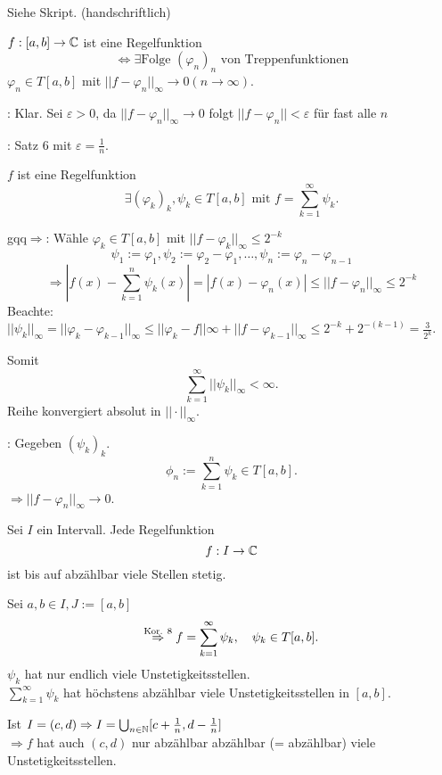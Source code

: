 \documentclass[../ana2.tex]{subfiles}
\begin{document}
\begin{bew}
    Siehe Skript. (handschriftlich)
\end{bew}
\begin{kor}
    \( f:[a,b]\rightarrow \mathbb{C} \) ist eine Regelfunktion 
    \[ \Leftrightarrow \exists \text{Folge } 
    (\varphi_n)_n \text{ von Treppenfunktionen} \]
    \( \varphi_n \in T[a,b] \) mit \( ||f-\varphi_n||_\infty 
    \rightarrow 0 (n\rightarrow \infty) \).
\end{kor}
\begin{bew}
    \gqq{\( \Leftarrow \)}: Klar. Sei \( \varepsilon > 0\), 
    da \( ||f-\varphi_n||_\infty \rightarrow 0 \) folgt 
    \( ||f-\varphi_n|| < \varepsilon \) für fast alle \(n\)
    
    \gqq{\( \Rightarrow \)}: Satz \(6\) 
    mit \( \varepsilon = \frac{1}{n} \).
\end{bew}
\begin{kor}
    \( f \) ist eine Regelfunktion
    \[ \exists (\varphi_k)_k, \psi_k \in T[a,b] 
    \text{ mit } f = \sum_{k=1}^\infty \psi_k. \]
\end{kor}
\begin{bew}
    gqq{\( \Rightarrow \)}: Wähle \( \varphi_k \in T[a,b] \)
    mit \( ||f-\varphi_k||_\infty \leq 2^{-k} \)
    \[ \psi_1 := \varphi_1, \psi_2 := \varphi_2 - \varphi_1, 
    \ldots, \psi_n := \varphi_n - \varphi_{n-1} \]
    \[ \Rightarrow |f(x) - \sum_{k=1}^n \psi_k(x)| 
    = |f(x)-\varphi_n(x)| \leq ||f-\varphi_n||_\infty \leq 2^{-k} \]
    Beachte: \( ||\psi_k||_\infty = ||\varphi_k - \varphi_{k-1}||_\infty
    \leq ||\varphi_k-f||\infty + ||f-\varphi_{k-1}||_\infty
    \leq 2^{-k} +  2^{-(k-1)} = \frac{3}{2^k} \).

    Somit 
    \[ \sum_{k=1}^\infty ||\psi_k||_\infty < \infty. \]
    Reihe konvergiert absolut in \( ||\cdot||_\infty \).

    \gqq{\( \Leftarrow \)}: Gegeben \( (\psi_k)_k \).
    \[ \phi_n := \sum_{k=1}^n \psi_k \in T[a,b]. \]
    \( \Rightarrow ||f - \varphi_n||_\infty \rightarrow 0 \).
\end{bew}
\begin{kor}
    Sei \(I\) ein Intervall. Jede Regelfunktion 
    \[ f:I\rightarrow \mathbb{C} \]
    ist bis auf abzählbar viele Stellen stetig.
\end{kor}
\begin{bew}
    Sei \( a,b \in I, J := [a,b] \)
    \[ \overset{\text{Kor. 8}}{\Rightarrow} f 
    = \sum_{k=1}^\infty \psi_k
    , \quad \psi_k \in T[a,b]. \]
    \( \psi_k \) hat nur endlich viele 
    Unstetigkeitsstellen.\\
    \( \sum_{k=1}^\infty \psi_k \) hat höchstens abzählbar viele 
    Unstetigkeitsstellen in \( [a,b] \).
    
    Ist \( I = (c,d) \Rightarrow I 
    = \bigcup_{n\in\mathbb{N}} 
    [c + \frac{1}{n}, d - \frac{1}{n}] \) \\
    \( \Rightarrow f\) hat auch \( (c,d) \) nur abzählbar 
    abzählbar (= abzählbar) viele Unstetigkeitsstellen.
\end{bew}
\end{document}
